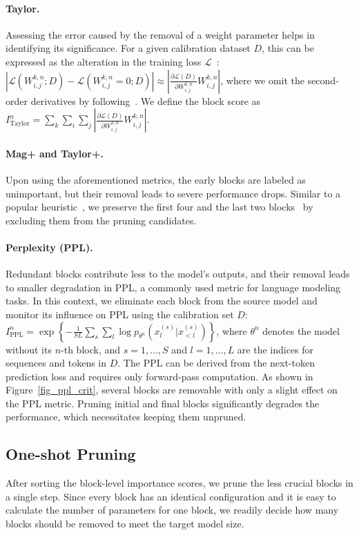 \paragraph{Taylor.} Assessing the error caused by the removal of a weight parameter helps in identifying its significance. For a given calibration dataset $D$, this can be expressed as the alteration in the training loss $\mathcal{L}$~\cite{lecun1989optimal,molchanov2019importance}: $\left| \mathcal{L}(W_{i,j}^{k,n}; D) - \mathcal{L}(W_{i,j}^{k,n} = 0; D) \right| \approx \left| \frac{\partial \mathcal{L}(D)}{\partial W_{i,j}^{k,n}} W_{i,j}^{k,n} \right|$, where we omit the second-order derivatives by following~\citet{llmpruner}. We define the block score as $I_{\mathrm{Taylor}}^n = \sum_k \sum_i  \sum_j \left| \frac{\partial \mathcal{L}(D)}{\partial W_{i,j}^{k,n}} W_{i,j}^{k,n} \right|$.

\paragraph{Mag+ and Taylor+.} Upon using the aforementioned metrics, the early blocks are labeled as unimportant, but their removal leads to severe performance drops. Similar to a popular heuristic~\cite{gale2019state,lee2021layeradaptive}, we preserve the first four and the last two blocks~\cite{llmpruner} by excluding them from the pruning candidates.

\paragraph{Perplexity (PPL).} Redundant blocks contribute less to the model's outputs, and their removal leads to smaller degradation in PPL, a commonly used metric for language modeling tasks. In this context, we eliminate each block from the source model and monitor its influence on PPL using the calibration set $D$: $I_{\mathrm{PPL}}^n = \exp \left\{ -\frac{1}{SL} \sum_{s} \sum_{l} \log p_{\theta^{n}}(x_{l}^{(s)} | x_{<l}^{(s)}) \right\}$, where $\theta^{n}$ denotes the model without its $n$-th block, and $s = 1, \ldots, S$ and $l = 1, \ldots, L$ are the indices for sequences and tokens in $D$. The PPL can be derived from the next-token prediction loss and requires only forward-pass computation. As shown in Figure~\ref{fig_ppl_crit}, several blocks are removable with only a slight effect on the PPL metric. Pruning initial and final blocks significantly degrades the performance, which necessitates keeping them unpruned. 

\subsection{One-shot Pruning}
After sorting the block-level importance scores, we prune the less crucial blocks in a single step. Since every block has an identical configuration and it is easy to calculate the number of parameters for one block, we readily decide how many blocks should be removed to meet the target model size.

